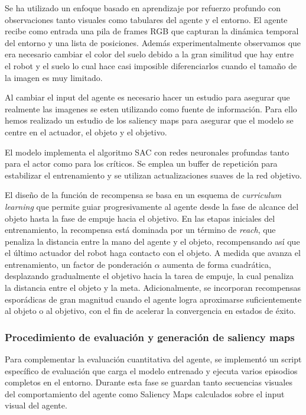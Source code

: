 \documentclass[10pt,twocolumn]{article}
\begin{document}
Se ha utilizado un enfoque basado en aprendizaje por refuerzo profundo con observaciones tanto visuales como tabulares del agente y el entorno. El agente recibe como entrada una pila de frames RGB que capturan la dinámica temporal del entorno y una lista de posiciones. Además experimentalmente observamos que era necesario cambiar el color del suelo debido a la gran similitud que hay entre el robot y el suelo lo cual hace casi imposible diferenciarlos cuando el tamaño de la imagen es muy limitado.

Al cambiar el input del agente es necesario hacer un estudio para asegurar que realmente las imagenes se esten utilizando como fuente de información. Para ello hemos realizado un estudio de los saliency maps para asegurar que el modelo se centre en el actuador, el objeto y el objetivo.

El modelo implementa el algoritmo SAC con redes neuronales profundas tanto para el actor como para los críticos. Se emplea un buffer de repetición para estabilizar el entrenamiento y se utilizan actualizaciones suaves de la red objetivo.

El diseño de la función de recompensa se basa en un esquema de \textit{curriculum learning} que permite guiar progresivamente al agente desde la fase de alcance del objeto hasta la fase de empuje hacia el objetivo. En las etapas iniciales del entrenamiento, la recompensa está dominada por un término de \textit{reach}, que penaliza la distancia entre la mano del agente y el objeto, recompensando así que el último actuador del robot haga contacto con el objeto. A medida que avanza el entrenamiento, un factor de ponderación $\alpha$ aumenta de forma cuadrática, desplazando gradualmente el objetivo hacia la tarea de empuje, la cual penaliza la distancia entre el objeto y la meta. Adicionalmente, se incorporan recompensas esporádicas de gran magnitud cuando el agente logra aproximarse suficientemente al objeto o al objetivo, con el fin de acelerar la convergencia en estados de éxito.

\subsubsection{Procedimiento de evaluación y generación de saliency maps}

Para complementar la evaluación cuantitativa del agente, se implementó un script específico de evaluación que carga el modelo entrenado y ejecuta varios episodios completos en el entorno. Durante esta fase se guardan tanto secuencias visuales del comportamiento del agente como Saliency Maps calculados sobre el input visual del agente.
\end{document}
